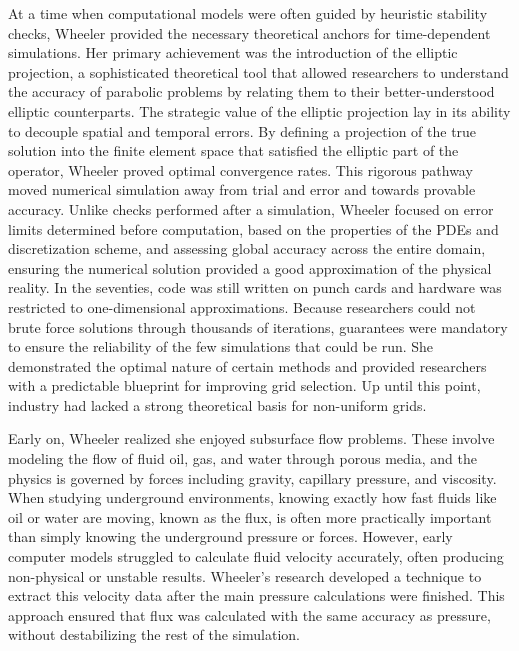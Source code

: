 At a time when computational models were often guided by heuristic stability checks, Wheeler provided the necessary theoretical anchors for time-dependent simulations. Her primary achievement was the introduction of the elliptic projection, a sophisticated theoretical tool that allowed researchers to understand the accuracy of parabolic problems by relating them to their better-understood elliptic counterparts. The strategic value of the elliptic projection lay in its ability to decouple spatial and temporal errors. By defining a projection of the true solution into the finite element space that satisfied the elliptic part of the operator, Wheeler proved optimal convergence rates. This rigorous pathway moved numerical simulation away from trial and error and towards provable accuracy. 
Unlike checks performed after a simulation, Wheeler focused on error limits determined before computation, based on the properties of the PDEs and discretization scheme, and assessing global accuracy across the entire domain, ensuring the numerical solution provided a good approximation of the physical reality. In the seventies, code was still written on punch cards and hardware was restricted to one-dimensional approximations. Because researchers could not brute force solutions through thousands of iterations, guarantees were mandatory to ensure the reliability of the few simulations that could be run. She demonstrated the optimal nature of certain methods and provided researchers with a predictable blueprint for improving grid selection. Up until this point, industry had lacked a strong theoretical basis for non-uniform grids. 

Early on, Wheeler realized she enjoyed subsurface flow problems. These involve modeling the flow of fluid oil, gas, and water through porous media, and the physics is governed by forces including gravity, capillary pressure, and viscosity. When studying underground environments, knowing exactly how fast fluids like oil or water are moving, known as the flux, is often more practically important than simply knowing the underground pressure or forces. However, early computer models struggled to calculate fluid velocity accurately, often producing non-physical or unstable results. Wheeler’s research developed a technique to extract this velocity data after the main pressure calculations were finished. This approach ensured that flux was calculated with the same accuracy as pressure, without destabilizing the rest of the simulation.

